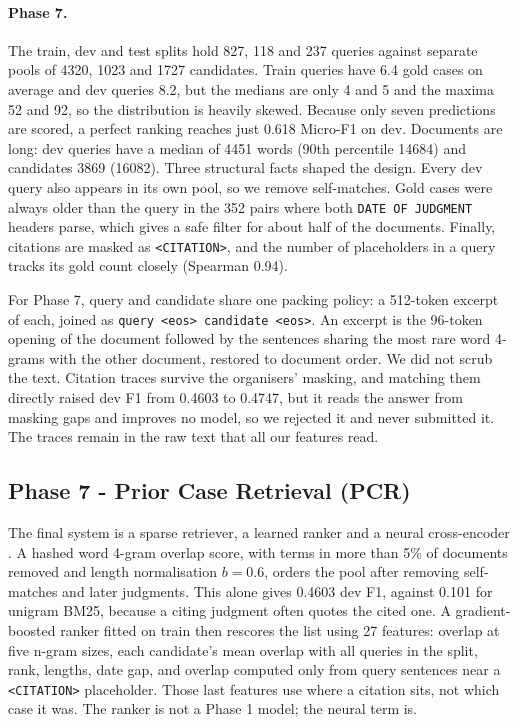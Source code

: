 
\paragraph{Phase 7.} The train, dev and test splits hold 827, 118 and 237 queries against separate pools of 4320, 1023 and 1727 candidates. Train queries have 6.4 gold cases on average and dev queries 8.2, but the medians are only 4 and 5 and the maxima 52 and 92, so the distribution is heavily skewed. Because only seven predictions are scored, a perfect ranking reaches just 0.618 Micro-F1 on dev. Documents are long: dev queries have a median of 4451 words (90th percentile 14684) and candidates 3869 (16082). Three structural facts shaped the design. Every dev query also appears in its own pool, so we remove self-matches. Gold cases were always older than the query in the 352 pairs where both \texttt{DATE OF JUDGMENT} headers parse, which gives a safe filter for about half of the documents. Finally, citations are masked as \texttt{<CITATION>}, and the number of placeholders in a query tracks its gold count closely (Spearman 0.94).

For Phase 7, query and candidate share one packing policy: a 512-token excerpt of each, joined as \texttt{query <eos> candidate <eos>}. An excerpt is the 96-token opening of the document followed by the sentences sharing the most rare word 4-grams with the other document, restored to document order. We did not scrub the text. Citation traces survive the organisers' masking, and matching them directly raised dev F1 from 0.4603 to 0.4747, but it reads the answer from masking gaps and improves no model, so we rejected it and never submitted it. The traces remain in the raw text that all our features read.

\subsection{Phase 7 - Prior Case Retrieval (PCR)}
The final system is a sparse retriever, a learned ranker and a neural cross-encoder \cite{nogueira2019passage}. A hashed word 4-gram overlap score, with terms in more than 5\% of documents removed and length normalisation $b=0.6$, orders the pool after removing self-matches and later judgments. This alone gives 0.4603 dev F1, against 0.101 for unigram BM25, because a citing judgment often quotes the cited one. A gradient-boosted ranker \cite{ke2017lightgbm} fitted on train then rescores the list using 27 features: overlap at five n-gram sizes, each candidate's mean overlap with all queries in the split, rank, lengths, date gap, and overlap computed only from query sentences near a \texttt{<CITATION>} placeholder. Those last features use where a citation sits, not which case it was. The ranker is not a Phase 1 model; the neural term is.

